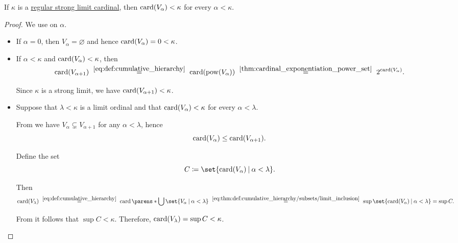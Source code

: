 \begin{proposition}\label{thm:strong_regular_cardinal_stages}
  If \( \kappa \) is a \hyperref[rem:strongly_inaccessible_cardinal]{regular strong limit cardinal}, then \( \operatorname{card}(V_\alpha) < \kappa \) for every \( \alpha < \kappa \).
\end{proposition}
\begin{proof}
  We use  on \( \alpha \).
  \begin{itemize}
    \item If \( \alpha = 0 \), then \( V_\alpha = \varnothing \) and hence \( \operatorname{card}(V_\alpha) = 0 < \kappa \).
    \item If \( \alpha < \kappa \) and \( \operatorname{card}(V_\alpha) < \kappa \), then
    \begin{equation*}
      \card(V_{\alpha + 1})
      \reloset {\eqref{eq:def:cumulative_hierarchy}} =
      \card(\pow(V_\alpha))
      \reloset {\ref{thm:cardinal_exponentiation_power_set}} =
      2^{\card(V_\alpha)}.
    \end{equation*}

    Since \( \kappa \) is a strong limit, we have \( \operatorname{card}(V_{\alpha + 1}) < \kappa \).

    \item Suppose that \( \lambda < \kappa \) is a limit ordinal and that \( \operatorname{card}(V_\alpha) < \kappa \) for every \( \alpha < \lambda \).

    From  we have \( V_\alpha \subsetneq V_{\alpha + 1} \) for any \( \alpha < \lambda \), hence
    \begin{equation}\label{eq:thm:def:cumulative_hierarchy/subsets/limit_inclusion}
      \operatorname{card}(V_\alpha) \leq \operatorname{card}(V_{\alpha + 1}).
    \end{equation}

    Define the set
    \begin{equation*}
      C \coloneqq \set{ \card(V_\alpha) \given \alpha < \lambda }.
    \end{equation*}

    Then
    \begin{equation*}
      \card(V_\lambda)
      \reloset {\eqref{eq:def:cumulative_hierarchy}} =
      \card\parens*{ \bigcup \set{ V_\alpha \given \alpha < \lambda } }
      \reloset {\eqref{eq:thm:def:cumulative_hierarchy/subsets/limit_inclusion}} =
      \sup\set{ \card(V_\alpha) \given \alpha < \lambda }
      =
      \sup C.
    \end{equation*}

    From  it follows that \( \sup C < \kappa \). Therefore, \( \operatorname{card}(V_\lambda) = \sup C < \kappa \).
  \end{itemize}
\end{proof}

